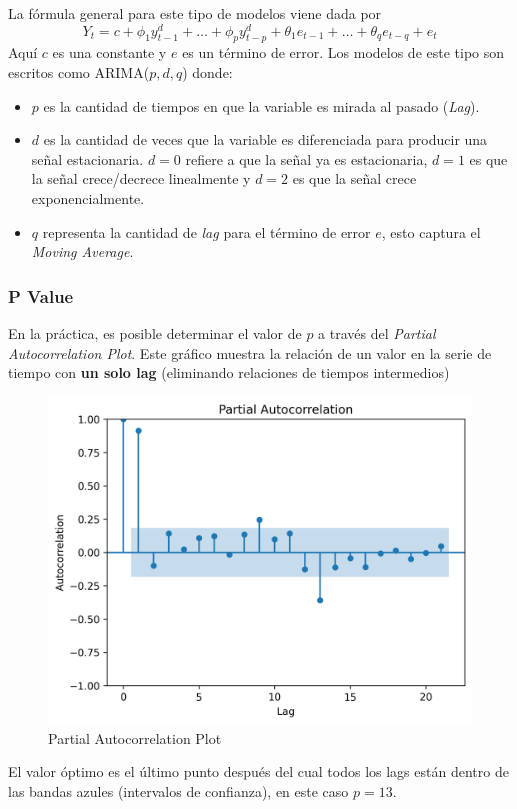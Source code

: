 La fórmula general para este tipo de modelos viene dada por 
$$
Y_t = c + \phi_1y^d_{t-1} + \dots + \phi_py^d_{t-p} + \theta_1e_{t-1} + \dots + \theta_q e_{t-q} + e_t
$$
Aquí $c$ es una constante y $e$ es un término de error. Los modelos de este tipo son escritos como ARIMA($p,d,q$) donde: 

\begin{itemize}
    \item $p$ es la cantidad de tiempos en que la variable es mirada al pasado (\textit{Lag}).
    \item $d$ es la cantidad de veces que la variable es diferenciada para producir una señal estacionaria. $d=0$ refiere a que la señal ya es estacionaria, $d=1$ es que la señal crece/decrece linealmente y $d=2$ es que la señal crece exponencialmente. 
    \item $q$ representa la cantidad de \textit{lag} para el término de error $e$, esto captura el \textit{Moving Average}.
\end{itemize}

\subsubsection{P Value}

En la práctica, es posible determinar el valor de $p$ a través del \textit{Partial Autocorrelation Plot}. Este gráfico muestra la relación de un valor en la serie de tiempo con \textbf{un solo lag} (eliminando relaciones de tiempos intermedios)
\begin{figure}[H]
    \center
    \includegraphics[scale=0.5]{notebooks/ML/img/partial_autocorrelation.png}
    \caption{Partial Autocorrelation Plot}
\end{figure}
El valor óptimo es el último punto después del cual todos los lags están dentro de las bandas azules (intervalos de confianza), en este caso $p=13$. 


